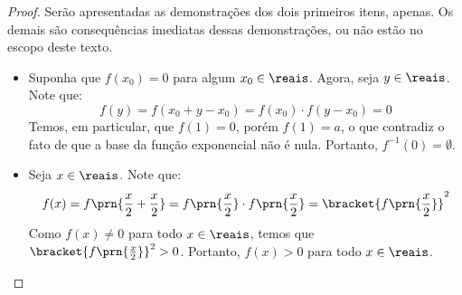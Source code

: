 \begin{proof}
    Serão apresentadas as demonstrações dos dois primeiros itens, apenas. Os demais são consequências 
    imediatas dessas demonstrações, ou não estão no escopo deste texto.
    \begin{itemize}
        \item Suponha que $f(x_0) = 0$ para algum $x_0 \in \reais$.
        Agora, seja $y \in \reais$. Note que:
        $$f(y) = f(x_0 + y - x_0) = f(x_0)\cdot f(y-x_0) = 0$$ 
        Temos, em particular, que $f(1)=0$, porém $f(1) = a$, o que contradiz
        o fato de que a base da função exponencial não é nula. 
        Portanto, $f^{-1}(0) = \emptyset$.

        \item Seja $x \in \reais$. Note que:
        $$f(x) = f\prn{\frac{x}{2} + \frac{x}{2}} = f\prn{\frac{x}{2}}\cdot f\prn{\frac{x}{2}} =\bracket{f\prn{\frac x 2}}^2$$
        Como $f(x) \ne 0$ para todo $x \in \reais$, temos que $\bracket{f\prn{\frac x 2}}^2 > 0$. Portanto, $f(x) > 0$ 
        para todo $x \in \reais$.
    \end{itemize}
\end{proof}